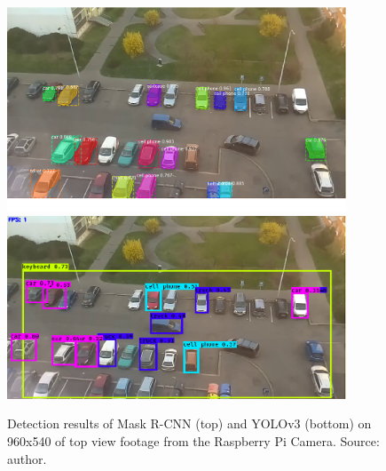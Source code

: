 \documentclass[thesis=M,english]{FITthesis}[2019/03/06]
\begin{document}
\begin{figure}[!htb]
	\centering
	\includegraphics[width=0.90\textwidth]{imgs/mask-raspi.png}
	\includegraphics[width=0.90\textwidth]{imgs/yolo-raspi.png}
	\caption{Detection results of Mask R-CNN (top) and YOLOv3 (bottom) on 960x540 of top view footage from the Raspberry Pi Camera. Source: author.}
	\label{label:comparison_raspi}
\end{figure}
\end{document}
